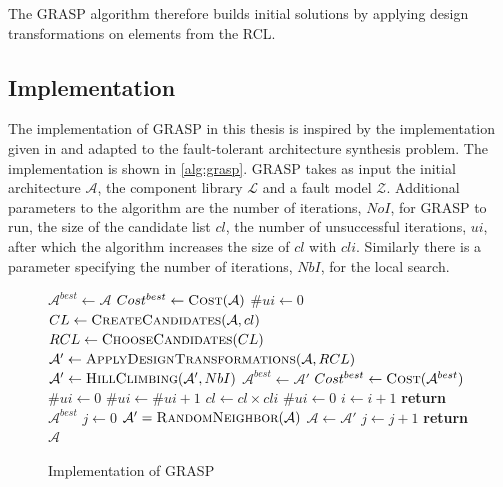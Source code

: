 The GRASP algorithm therefore builds initial solutions by applying design transformations on elements from the RCL.

\subsection{Implementation}
The implementation of GRASP in this thesis is inspired by the implementation given in \cite{domi-grasp} and adapted to the fault-tolerant architecture synthesis problem. The implementation is shown in \autoref{alg:grasp}. GRASP takes as input the initial architecture $\mathcal{A}$, the component library $\mathcal{L}$ and a fault model $\mathcal{Z}$. Additional parameters to the algorithm are the number of iterations, $NoI$, for GRASP to run, the size of the candidate list $cl$, the number of unsuccessful iterations, $ui$, after which the algorithm increases the size of $cl$ with $cli$. Similarly there is a parameter specifying the number of iterations, $NbI$, for the local search.

\begin{figure}
\centering
\begin{algorithmic}[1]
	\State $\mathcal{A}^{best} \gets \mathcal{A}$
	\State $Cost^{best} \gets \Call{Cost}{\mathcal{A}}$
	\State $\#ui \gets 0$
	\State $CL \gets \Call{CreateCandidates}{\mathcal{A}, cl}$
	\State $RCL \gets \Call{ChooseCandidates}{CL}$
	\State $\mathcal{A}' \gets \Call{ApplyDesignTransformations}{\mathcal{A}, RCL}$
	\State $\mathcal{A'} \gets \Call{HillClimbing}{\mathcal{A}', NbI}$
			\State $\mathcal{A}^{best} \gets \mathcal{A}'$ 
			\State $Cost^{best} \gets \Call{Cost}{\mathcal{A}^{best}}$
			\State $\#ui \gets 0$
		\Else
			\State $\#ui \gets \#ui + 1$
		\EndIf
			\State $cl \gets cl \times cli$
			\State $\#ui \gets 0$
		\EndIf
		\State $i \gets i + 1$
      \EndWhile
	\State \textbf{return} $\mathcal{A}^{best}$
    \EndFunction
{}
	\State $j \gets 0$
		\State $\mathcal{A}' = \Call{RandomNeighbor}{\mathcal{A}}$
		 	\State $\mathcal{A} \gets \mathcal{A}'$
		\EndIf
		\State $j \gets j + 1$
	\EndWhile
	\State \textbf{return} $\mathcal{A}$
\EndFunction
\end{algorithmic}
\caption[Implementation of GRASP]{Implementation of GRASP}
\label{alg:grasp}
\end{figure}


